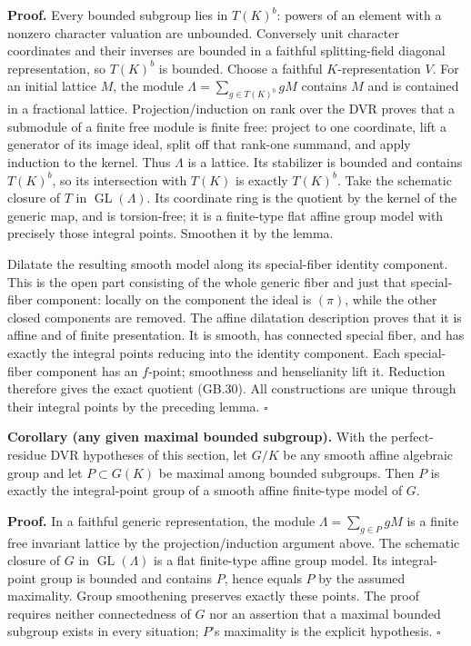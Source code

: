 \documentclass[
  11pt,
]{article}
\begin{document}
\textbf{Proof.} Every bounded subgroup lies in \(T(K)^b\): powers of an
element with a nonzero character valuation are unbounded. Conversely
unit character coordinates and their inverses are bounded in a faithful
splitting-field diagonal representation, so \(T(K)^b\) is bounded.
Choose a faithful \(K\)-representation \(V\). For an initial lattice
\(M\), the module \(\Lambda=\sum_{g\in T(K)^b}gM\) contains \(M\) and is
contained in a fractional lattice. Projection/induction on rank over the
DVR proves that a submodule of a finite free module is finite free:
project to one coordinate, lift a generator of its image ideal, split
off that rank-one summand, and apply induction to the kernel. Thus
\(\Lambda\) is a lattice. Its stabilizer is bounded and contains
\(T(K)^b\), so its intersection with \(T(K)\) is exactly \(T(K)^b\).
Take the schematic closure of \(T\) in \(\operatorname {GL}(\Lambda)\).
Its coordinate ring is the quotient by the kernel of the generic map,
and is torsion-free; it is a finite-type flat affine group model with
precisely those integral points. Smoothen it by the lemma.

Dilatate the resulting smooth model along its special-fiber identity
component. This is the open part consisting of the whole generic fiber
and just that special-fiber component: locally on the component the
ideal is \((\pi)\), while the other closed components are removed. The
affine dilatation description proves that it is affine and of finite
presentation. It is smooth, has connected special fiber, and has exactly
the integral points reducing into the identity component. Each
special-fiber component has an \(f\)-point; smoothness and henselianity
lift it. Reduction therefore gives the exact quotient (GB.30). All
constructions are unique through their integral points by the preceding
lemma. \(\square\)

\textbf{Corollary (any given maximal bounded subgroup).} With the
perfect-residue DVR hypotheses of this section, let \(G/K\) be any
smooth affine algebraic group and let \(P\subset G(K)\) be maximal among
bounded subgroups. Then \(P\) is exactly the integral-point group of a
smooth affine finite-type model of \(G\).

\textbf{Proof.} In a faithful generic representation, the module
\(\Lambda=\sum_{g\in P}gM\) is a finite free invariant lattice by the
projection/induction argument above. The schematic closure of \(G\) in
\(\operatorname {GL}(\Lambda)\) is a flat finite-type affine group
model. Its integral-point group is bounded and contains \(P\), hence
equals \(P\) by the assumed maximality. Group smoothening preserves
exactly these points. The proof requires neither connectedness of \(G\)
nor an assertion that a maximal bounded subgroup exists in every
situation; \(P\)'s maximality is the explicit hypothesis. \(\square\)
\end{document}
